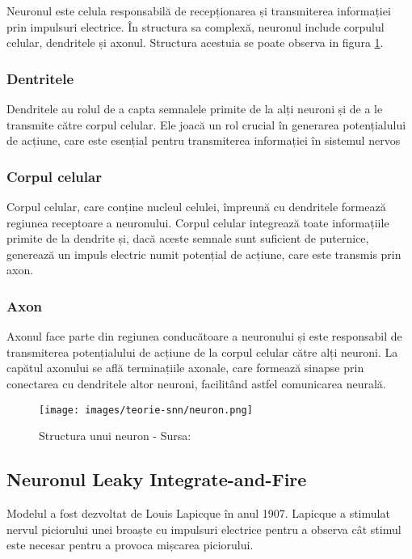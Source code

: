 Neuronul este celula responsabilă de recepționarea și transmiterea informației prin impulsuri electrice. În structura sa complexă, neuronul include corpulul celular, dendritele și axonul. Structura acestuia se poate observa in figura \ref{fig:neuron}.


\subsubsection{Dentritele}
Dendritele au rolul de a capta semnalele primite de la alți neuroni și de a le transmite către corpul celular. Ele joacă un rol crucial în generarea potențialului de acțiune, care este esențial pentru transmiterea informației în sistemul nervos


\subsubsection{Corpul celular}
Corpul celular, care conține nucleul celulei, împreună cu dendritele formează regiunea receptoare a neuronului. Corpul celular integrează toate informațiile primite de la dendrite și, dacă aceste semnale sunt suficient de puternice, generează un impuls electric numit potențial de acțiune, care este transmis prin axon.

\subsubsection{Axon}
Axonul face parte din regiunea conducătoare a neuronului și este responsabil de transmiterea potențialului de acțiune de la corpul celular către alți neuroni. La capătul axonului se află terminațiile axonale, care formează sinapse prin conectarea cu dendritele altor neuroni, facilitând astfel comunicarea neurală.

\begin{figure}
    \centering
    \texttt{[image: images/teorie-snn/neuron.png]}
    \caption{Structura unui neuron - Sursa: \cite{neuronReseachGate}}
    \label{fig:neuron}
\end{figure}

\subsection{Neuronul Leaky Integrate-and-Fire}

Modelul a fost dezvoltat de Louis Lapicque în anul 1907. Lapicque a stimulat nervul piciorului unei broaște cu impulsuri electrice pentru a observa cât stimul este necesar pentru a provoca mișcarea piciorului.

